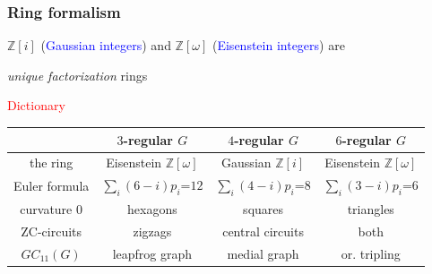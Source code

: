 \documentclass{beamer}
\newcommand{\ZZ}{\ensuremath{\mathbb{Z}}}
\begin{document}
\begin{frame}\frametitle{Ring formalism}
$\ZZ[i]$ (\textcolor{blue}{Gaussian integers}) and
$\ZZ[\omega]$ (\textcolor{blue}{Eisenstein integers})
are 

{\em unique factorization} rings
\begin{center}
\textcolor{red}{Dictionary}
\end{center}
\begin{center}
{\small
\begin{tabular}{||c|c|c|c||}
\hline\hline
   &$3$-regular $G$& $4$-regular
$G$ &$6$-regular $G$\\\hline
the ring           &Eisenstein
$\ZZ[\omega]$ &Gaussian
$\ZZ[i]$&Eisenstein
$\ZZ[\omega]$\\
Euler formula  &$\sum_{i} (6-i)p_i$=$12$
&$\sum_{i}
(4-i)p_i$=$8$&$\sum_{i} (3-i)p_i$=$6$\\
curvature $0$&hexagons
&squares&triangles\\
ZC-circuits    &zigzags
&central circuits& both\\
$GC_{11}(G)$      &leapfrog graph
    &medial graph& or. tripling\\
\hline\hline\end{tabular}
}
\end{center}
\end{frame} 
\end{document}
